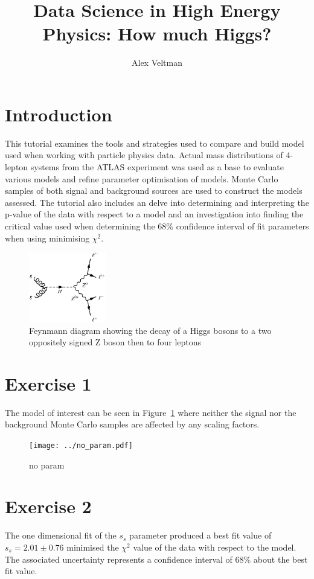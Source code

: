 \documentclass{article}
\title{Data Science in High Energy Physics: How much Higgs?}
\author{Alex Veltman}
\begin{document}
\maketitle

\section*{Introduction}
This tutorial examines the tools and strategies used to compare and build model used when working with particle physics data.
Actual mass distributions of 4-lepton systems from the ATLAS experiment was used as a base to evaluate various models and refine parameter optimisation of models.
Monte Carlo samples of both signal and background sources are used to construct the models assessed.
The tutorial also includes an delve into determining and interpreting the p-value of the data with respect to a model and an investigation into finding the critical value used when determining the 68\% confidence interval of fit parameters when using minimising $\chi^2$.


\begin{figure}
    \centering
    \includegraphics[width=0.3\textwidth]{../hzz.png}
    \caption{Feynmann diagram showing the decay of a Higgs bosons to a two oppositely signed Z boson then to four leptons}
\end{figure}

\section*{Exercise 1}
The model of interest can be seen in Figure~\ref{fig:no_param} where neither the signal nor the background Monte Carlo samples are affected by any scaling factors. 


\begin{figure}
    \centering
    \texttt{[image: ../no\_param.pdf]}
    \caption{no param}\label{fig:no_param}
\end{figure}

\section*{Exercise 2}
The one dimensional fit of the $s_s$ parameter produced a best fit value of $s_s= 2.01 \pm 0.76$ minimised the $\chi^2$ value of the data with respect to the model.
The associated uncertainty represents a confidence interval of 68\% about the best fit value.
\end{document}
